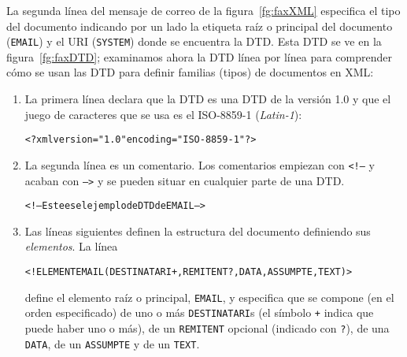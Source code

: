 La segunda línea del mensaje de correo de la figura~\ref{fg:faxXML} especifica el tipo del documento indicando por un lado la etiqueta raíz o principal del documento (\texttt{EMAIL}) y el URI (\texttt{SYSTEM}) donde se encuentra la DTD. Esta DTD se ve en la figura~\ref{fg:faxDTD}; examinamos ahora la DTD línea por línea para comprender cómo se usan las DTD para definir familias (tipos) de documentos en XML: \begin{enumerate} \item La primera línea declara que la DTD es una DTD de la versión 1.0 y que el juego de caracteres que se usa es el ISO-8859-1 (\emph{Latin-1}): \begin{small}\begin{alltt} <?xml version="1.0" encoding="ISO-8859-1"?> \end{alltt}\end{small} 

\item La segunda línea es un comentario. Los comentarios empiezan con \texttt{<!--} y acaban con \texttt{-->} y se pueden situar en cualquier parte de una DTD. \begin{small}\begin{alltt} <!-- Este es el ejemplo de DTD de EMAIL --> \end{alltt}\end{small} 

\item Las líneas siguientes definen la estructura del documento definiendo sus \emph{elementos}. La línea \begin{small}\begin{alltt} <!ELEMENT EMAIL (DESTINATARI+, REMITENT?, DATA, ASSUMPTE, TEXT)> \end{alltt}\end{small} define el elemento raíz o principal, \texttt{EMAIL}, y especifica que se compone (en el orden especificado) de uno o más \texttt{DESTINATARI}s (el símbolo \texttt{+} indica que puede haber uno o más), de un \texttt{REMITENT} opcional (indicado con \texttt{?}), de una  \texttt{DATA}, de un \texttt{ASSUMPTE} y de un \texttt{TEXT}. 


\end{enumerate}
